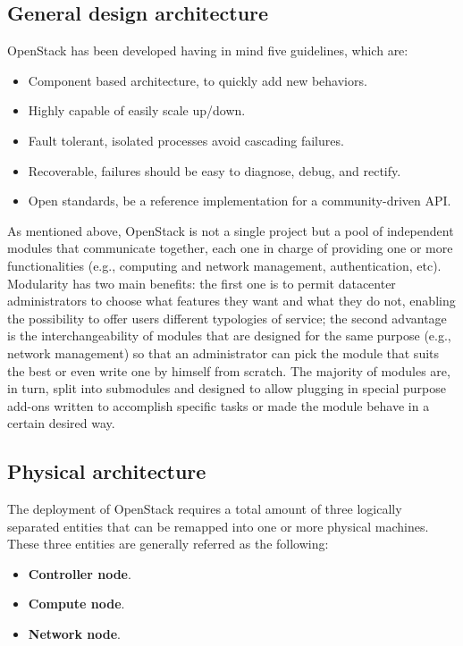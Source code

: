 \subsection{General design architecture}
OpenStack has been developed having in mind five guidelines, which are:
\begin{itemize}
    \item Component based architecture, to quickly add new behaviors.
    \item Highly capable of easily scale up/down.
    \item Fault tolerant, isolated processes avoid cascading failures.
    \item Recoverable, failures should be easy to diagnose, debug, and rectify.
    \item Open standards, be a reference implementation for a community-driven API.
\end{itemize}
As mentioned above, OpenStack is not a single project but a pool of independent modules that communicate together, each one in charge of providing one or more functionalities (e.g., computing and network management, authentication, etc).
Modularity has two main benefits: the first one is to permit datacenter administrators to choose what features they want and what they do not, enabling the possibility to offer users different typologies of service; the second advantage is the interchangeability of modules that are designed for the same purpose (e.g., network management) so that an administrator can pick the module that suits the best or even write one by himself from scratch.
The majority of modules are, in turn, split into submodules and designed to allow plugging in special purpose add-ons written to accomplish specific tasks or made the module behave in a certain desired way.

\subsection{Physical architecture}
The deployment of OpenStack requires a total amount of three logically separated entities that can be remapped into one or more physical machines.
These three entities are generally referred as the following:
\begin{itemize}
    \item \textbf{Controller node}.
    \item \textbf{Compute node}.
    \item \textbf{Network node}.
\end{itemize}

